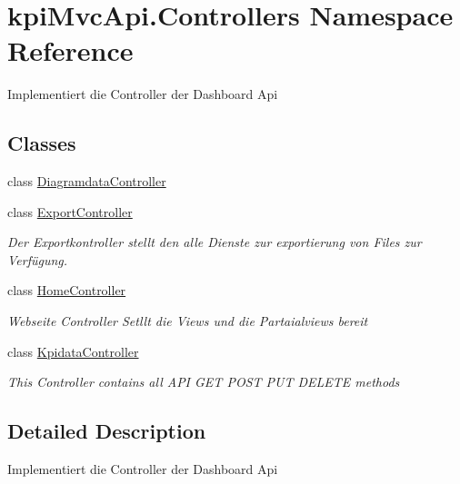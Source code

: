 \hypertarget{namespacekpi_mvc_api_1_1_controllers}{}\section{kpi\+Mvc\+Api.\+Controllers Namespace Reference}
\label{namespacekpi_mvc_api_1_1_controllers}


Implementiert die Controller der Dashboard Api  


\subsection*{Classes}
\begin{DoxyCompactItemize}
\item 
class \hyperlink{classkpi_mvc_api_1_1_controllers_1_1_diagramdata_controller}{Diagramdata\+Controller}
\item 
class \hyperlink{classkpi_mvc_api_1_1_controllers_1_1_export_controller}{Export\+Controller}
\begin{DoxyCompactList}\small\item\em Der Exportkontroller stellt den alle Dienste zur exportierung von Files zur Verfügung. \end{DoxyCompactList}\item 
class \hyperlink{classkpi_mvc_api_1_1_controllers_1_1_home_controller}{Home\+Controller}
\begin{DoxyCompactList}\small\item\em Webseite Controller Setllt die Views und die Partaialviews bereit \end{DoxyCompactList}\item 
class \hyperlink{classkpi_mvc_api_1_1_controllers_1_1_kpidata_controller}{Kpidata\+Controller}
\begin{DoxyCompactList}\small\item\em This Controller contains all A\+PI G\+ET P\+O\+ST P\+UT D\+E\+L\+E\+TE methods \end{DoxyCompactList}\end{DoxyCompactItemize}


\subsection{Detailed Description}
Implementiert die Controller der Dashboard Api 


